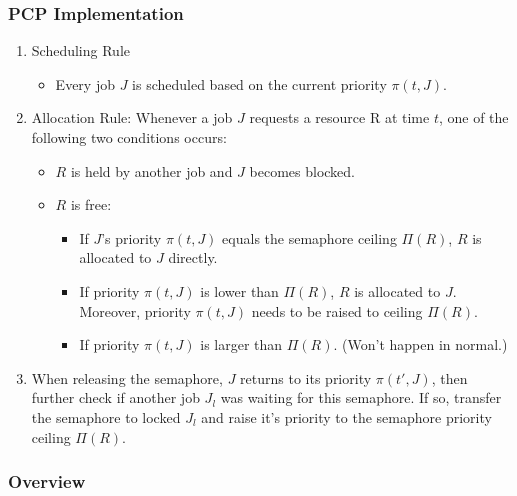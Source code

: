 \documentclass[t]{beamer}
\begin{document}
\begin{frame}
  \frametitle{PCP Implementation}
  \label{sec-1-1}%
  \footnotesize
  \begin{enumerate}\small
  \item Scheduling Rule
    \begin{itemize}
    \item Every job $J$ is scheduled based on the
      current priority $\pi(t, J)$.
    \end{itemize}
  \item Allocation Rule: Whenever a job $J$ requests a resource R at
    time $t$, one of the following two conditions occurs:
    \begin{itemize}
    \item $R$ is held by another job and $J$ becomes blocked.
    \item $R$ is free:
      \begin{itemize}
      \item If $J$'s priority $\pi(t, J)$ equals the semaphore ceiling $\Pi(R)$, $R$ is allocated to $J$ directly.
      \item If priority $\pi(t, J)$ is lower than $\Pi(R)$, $R$ is allocated to
        $J$. Moreover, priority $\pi(t, J)$ needs to be raised to ceiling $\Pi(R)$.
      \item If priority $\pi(t, J)$ is larger than $\Pi(R)$. (Won't happen in normal.)
      \end{itemize}
    \end{itemize}
    \item When releasing the semaphore, $J$ returns to its priority $\pi(t', J)$, then further check if another job $J_l$ was waiting for this semaphore. If so, transfer the semaphore to locked $J_l$ and raise it's priority to the semaphore priority ceiling $\Pi(R)$.
  \end{enumerate}
\end{frame}
\begin{frame}
\frametitle{Overview}
\end{frame}
\end{document}
